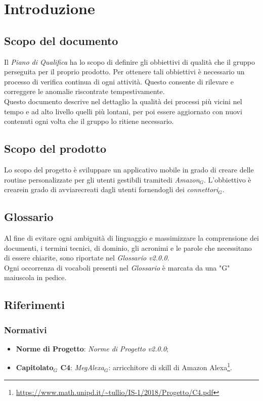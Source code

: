 \chapter{Introduzione}
\label{introduzione}
\section{Scopo del documento}
Il \textit{Piano di Qualifica} ha lo scopo di definire gli obbiettivi di qualità che il gruppo perseguita per il proprio prodotto. Per ottenere tali obbiettivi è necessario un processo di verifica continua di ogni attività. Questo consente di rilevare e correggere le anomalie riscontrate tempestivamente.\\
Questo documento descrive nel dettaglio la qualità dei processi più vicini nel tempo e ad alto livello quelli più lontani, per poi essere aggiornato con nuovi contenuti ogni volta che il gruppo lo ritiene necessario.
\section{Scopo del prodotto}
Lo scopo del progetto è sviluppare un applicativo mobile in grado di creare delle routine personalizzate per gli utenti gestibili tramitedi \textit{Amazon$_{G}$}. L'obbiettivo è crearein grado di avviarecreati dagli utenti fornendogli dei \textit{connettori$_{G}$}.
\section{Glossario}
Al fine di evitare ogni ambiguità di linguaggio e massimizzare la comprensione dei documenti, i termini tecnici, di dominio, gli acronimi e le parole che necessitano di essere chiarite, sono riportate nel \textit{Glossario v2.0.0}.\\
Ogni occorrenza di vocaboli presenti nel \textit{Glossario} è marcata da una "G" maiuscola in pedice.
\section{Riferimenti}
\subsection{Normativi}
\begin{itemize}
	\item  \textbf{Norme di Progetto}: \textit{Norme di Progetto v2.0.0};
	\item \textbf{Capitolato$_{G}$ C4}: \textit{MegAlexa$_{G}$}: arricchitore di skill di Amazon Alexa\footnote{\url{https://www.math.unipd.it/~tullio/IS-1/2018/Progetto/C4.pdf}}.
\end{itemize}
